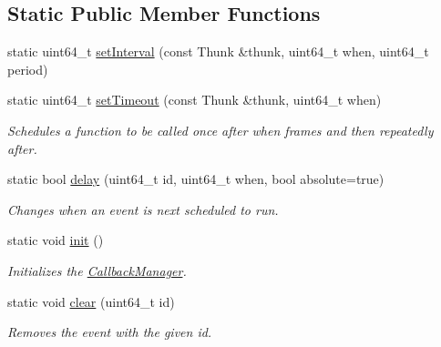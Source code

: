 \subsection*{Static Public Member Functions}
\begin{DoxyCompactItemize}
\item 
static uint64\+\_\+t \hyperlink{classnta_1_1CallbackManager_a1fd6132e79e49dbcb787bc8a8507a931}{set\+Interval} (const Thunk \&thunk, uint64\+\_\+t when, uint64\+\_\+t period)
\item 
\mbox{\label{classnta_1_1CallbackManager_ac51c18a014641ffe9dbfe8ead0f6bae0}} 
static uint64\+\_\+t \hyperlink{classnta_1_1CallbackManager_ac51c18a014641ffe9dbfe8ead0f6bae0}{set\+Timeout} (const Thunk \&thunk, uint64\+\_\+t when)
\begin{DoxyCompactList}\small\item\em Schedules a function to be called once after when frames and then repeatedly after. \end{DoxyCompactList}\item 
\mbox{\label{classnta_1_1CallbackManager_af184e9fbc5353c8e019cf61c51c03448}} 
static bool \hyperlink{classnta_1_1CallbackManager_af184e9fbc5353c8e019cf61c51c03448}{delay} (uint64\+\_\+t id, uint64\+\_\+t when, bool absolute=true)
\begin{DoxyCompactList}\small\item\em Changes when an event is next scheduled to run. \end{DoxyCompactList}\item 
\mbox{\label{classnta_1_1CallbackManager_a2c8114a6c1e8de9c59b6484f47dde1a3}} 
static void \hyperlink{classnta_1_1CallbackManager_a2c8114a6c1e8de9c59b6484f47dde1a3}{init} ()
\begin{DoxyCompactList}\small\item\em Initializes the \hyperlink{classnta_1_1CallbackManager}{Callback\+Manager}. \end{DoxyCompactList}\item 
\mbox{\label{classnta_1_1CallbackManager_a4af0feb66d42bd32d5bde2e4a52519a9}} 
static void \hyperlink{classnta_1_1CallbackManager_a4af0feb66d42bd32d5bde2e4a52519a9}{clear} (uint64\+\_\+t id)
\begin{DoxyCompactList}\small\item\em Removes the event with the given id. \end{DoxyCompactList}\item 

\end{DoxyCompactItemize}
